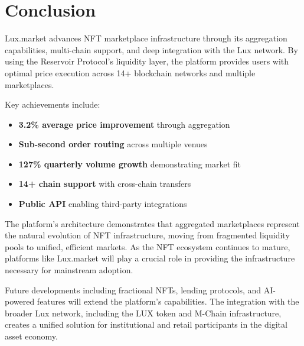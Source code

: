 \section{Conclusion}


Lux.market advances NFT marketplace infrastructure through its aggregation capabilities, multi-chain support, and deep integration with the Lux network. By using the Reservoir Protocol's liquidity layer, the platform provides users with optimal price execution across 14+ blockchain networks and multiple marketplaces.

Key achievements include:

\begin{itemize}
\item \textbf{3.2\% average price improvement} through aggregation
\item \textbf{Sub-second order routing} across multiple venues
\item \textbf{127\% quarterly volume growth} demonstrating market fit
\item \textbf{14+ chain support} with cross-chain transfers
\item \textbf{Public API} enabling third-party integrations
\end{itemize}

The platform's architecture demonstrates that aggregated marketplaces represent the natural evolution of NFT infrastructure, moving from fragmented liquidity pools to unified, efficient markets. As the NFT ecosystem continues to mature, platforms like Lux.market will play a crucial role in providing the infrastructure necessary for mainstream adoption.

Future developments including fractional NFTs, lending protocols, and AI-powered features will extend the platform's capabilities. The integration with the broader Lux network, including the LUX token and M-Chain infrastructure, creates a unified solution for institutional and retail participants in the digital asset economy.

